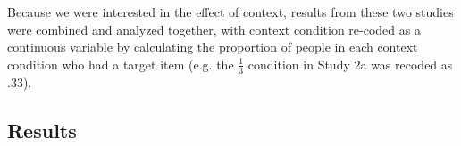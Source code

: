 \documentclass[10pt,letterpaper]{article}
\begin{document}
Because we were interested in the effect of context, results from these two studies were combined and analyzed together, with context condition re-coded as a continuous variable by calculating the proportion of people in each context condition who had a target item (e.g. the $\frac{1}{3}$ condition in Study 2a was recoded as .33). 

\subsection{Results}
%
\end{document}
